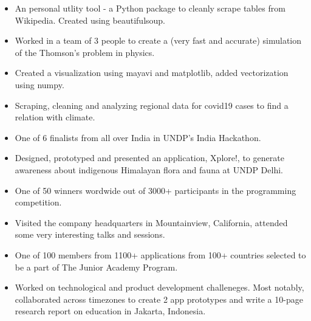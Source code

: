\documentclass[a4paper]{resume}
\begin{document}
\begin{itemize} \vspace{-5pt} \itemsep -2pt
	\item An personal utlity tool - a Python package to cleanly scrape tables from Wikipedia. Created using beautifulsoup.
\end{itemize}
\enresubsection
{}
\begin{itemize} \vspace{-5pt} \itemsep -2pt
	\item Worked in a team of 3 people to create a (very fast and accurate) simulation of the Thomson's problem in physics.
	\item Created a visualization using mayavi and matplotlib, added vectorization using numpy.
\end{itemize}
\enresubsection
{}
\begin{itemize} \vspace{-5pt} \itemsep -2pt
	\item Scraping, cleaning and analyzing regional data for covid19 cases to find a relation with climate.
\end{itemize}
\enresection

\begin{itemize} \vspace{-5pt} \itemsep -2pt
	\item One of 6 finalists from all over India in UNDP's India Hackathon.
	\item Designed, prototyped and presented an application, Xplore!, to generate awareness about indigenous Himalayan flora and fauna at UNDP Delhi.
\end{itemize}
\enresubsection
{}
\begin{itemize} \vspace{-5pt} \itemsep -2pt
	\item One of 50 winners wordwide out of 3000+ participants in the programming competition. 
	\item Visited the company headquarters in Mountainview, California, attended some very interesting talks and sessions.
\end{itemize}
\enresubsection
{}
\begin{itemize} \vspace{-5pt} \itemsep -2pt
	\item One of 100 members from 1100+ applications from 100+ countries selected to be a part
of The Junior Academy Program.
	\item Worked on technological and product development challeneges. Most notably, collaborated across timezones to create 2 app prototypes and write a 10-page research report on education in Jakarta, Indonesia.
\end{itemize}
\enresection
\end{document}
